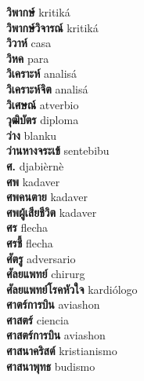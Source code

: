 \textbf{ วิพากษ์  } kritiká \\
\textbf{ วิพากษ์วิจารณ์  } kritiká \\
\textbf{ วิวาห์  } casa \\
\textbf{ วิหค  } para \\
\textbf{ วิเคราะห์  } analisá \\
\textbf{ วิเคราะห์จิต  } analisá \\
\textbf{ วิเศษณ์  } atverbio \\
\textbf{ วุฒิบัตร  } diploma \\
\textbf{ ว่าง  } blanku \\
\textbf{ ว่านหางจระเข้  } sentebibu \\
\textbf{ ศ.  } djabièrnè \\
\textbf{ ศพ  } kadaver \\
\textbf{ ศพคนตาย  } kadaver \\
\textbf{ ศพผู้เสียชีวิต  } kadaver \\
\textbf{ ศร  } flecha \\
\textbf{ ศรชี้  } flecha \\
\textbf{ ศัตรู  } adversario \\
\textbf{ ศัลยแพทย์  } chirurg \\
\textbf{ ศัลยแพทย์โรคหัวใจ  } kardiólogo \\
\textbf{ ศาตร์การบิน  } aviashon \\
\textbf{ ศาสตร์  } ciencia \\
\textbf{ ศาสตร์การบิน  } aviashon \\
\textbf{ ศาสนาคริสต์  } kristianismo \\
\textbf{ ศาสนาพุทธ  } budismo \\
